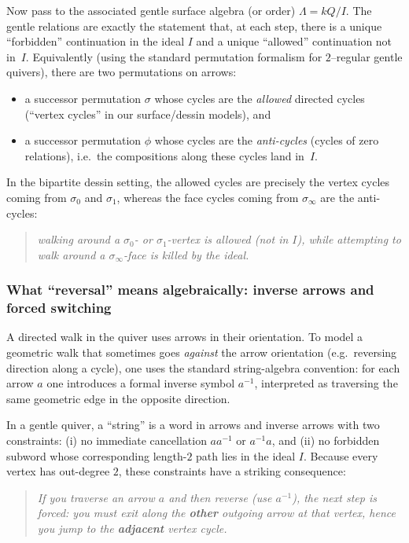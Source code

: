 \documentclass[11pt,oneside]{amsbook}
\numberwithin{equation}{section}
\theoremstyle{plain}
\theoremstyle{definition}
\theoremstyle{remark}
\begin{document}
\begin{enumerate}
Now pass to the associated gentle surface algebra (or order) $\Lambda=k Q/I$.
The gentle relations are exactly the statement that, at each step, there is a unique ``forbidden'' continuation in the ideal $I$ and a unique ``allowed'' continuation not in~$I$.
Equivalently (using the standard permutation formalism for $2$--regular gentle quivers), there are two permutations on arrows:
\begin{itemize}
\item a successor permutation $\sigma$ whose cycles are the \emph{allowed} directed cycles (``vertex cycles'' in our surface/dessin models), and
\item a successor permutation $\phi$ whose cycles are the \emph{anti-cycles} (cycles of zero relations), i.e.\ the compositions along these cycles land in~$I$.
\end{itemize}
In the bipartite dessin setting, the allowed cycles are precisely the vertex cycles coming from $\sigma_0$ and $\sigma_1$,
whereas the face cycles coming from $\sigma_\infty$ are the anti-cycles:
\begin{quote}
\emph{walking around a $\sigma_0$- or $\sigma_1$-vertex is allowed (not in $I$), while attempting to walk around a $\sigma_\infty$-face is killed by the ideal.}
\end{quote}

\subsubsection{What ``reversal'' means algebraically: inverse arrows and forced switching}

A directed walk in the quiver uses arrows in their orientation.
To model a geometric walk that sometimes goes \emph{against} the arrow orientation (e.g.\ reversing direction along a cycle),
one uses the standard string-algebra convention: for each arrow $a$ one introduces a formal inverse symbol $a^{-1}$,
interpreted as traversing the same geometric edge in the opposite direction.

In a gentle quiver, a ``string'' is a word in arrows and inverse arrows with two constraints:
(i) no immediate cancellation $aa^{-1}$ or $a^{-1}a$, and
(ii) no forbidden subword whose corresponding length-$2$ path lies in the ideal $I$.
Because every vertex has out-degree $2$, these constraints have a striking consequence:

\begin{quote}
\emph{If you traverse an arrow $a$ and then reverse (use $a^{-1}$), the next step is forced: you must exit along the \textbf{other} outgoing arrow at that vertex, hence you jump to the \textbf{adjacent} vertex cycle.}
\end{quote}


\end{enumerate}
\end{document}
